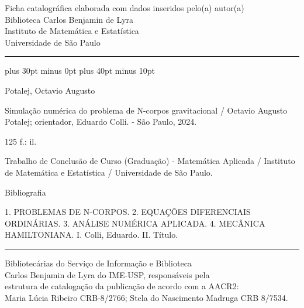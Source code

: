 \begingroup\centering\singlespacing\small
{}
Ficha catalográfica elaborada com dados inseridos pelo(a) autor(a)\\
Biblioteca Carlos Benjamin de Lyra\\
Instituto de Matemática e Estatística\\
Universidade de São Paulo\par
\vspace{2\baselineskip}\hrule\vspace{.8\baselineskip}
\RaggedRightRightskip 0pt plus 30pt minus 0pt\relax
\RaggedRightParfillskip 20pt plus 40pt minus 10pt\relax
\ttfamily\hspace{2em}\begin{minipage}[t]{125mm}
\RaggedRight\sloppy{}

\noindent Potalej, Octavio Augusto

Simulação numérica do problema de N-corpos gravitacional / Octavio Augusto Potalej; orientador, Eduardo Colli. - São Paulo, 2024.

125 f.: il.

\vspace{1\baselineskip}


\vspace{1\baselineskip}


Trabalho de Conclusão de Curso (Graduação) - Matemática Aplicada / Instituto de Matemática e Estatística / Universidade de São Paulo.

Bibliografia



\vspace{1\baselineskip}


\vspace{1\baselineskip}


1. PROBLEMAS DE N-CORPOS. 2. EQUAÇÕES DIFERENCIAIS ORDINÁRIAS. 3. ANÁLISE NUMÉRICA APLICADA. 4. MECÂNICA HAMILTONIANA. I. Colli, Eduardo. II. Título.

\end{minipage}\par
\vspace{1\baselineskip}\hrule\vspace{.5\baselineskip}\rmfamily
Bibliotecárias do Serviço de Informação e Biblioteca\\
Carlos Benjamin de Lyra do IME-USP, responsáveis pela\\
estrutura de catalogação da publicação de acordo com a AACR2:\\
Maria Lúcia Ribeiro CRB-8/2766; Stela do Nascimento Madruga CRB 8/7534.
\par\endgroup
